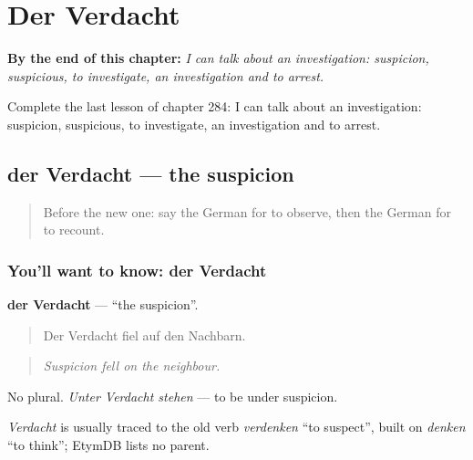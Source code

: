 
\chapter{Der Verdacht}
\label{ch:ge-der-verdacht}

\begin{chapteropening}
\textbf{By the end of this chapter:} \emph{I can talk about an investigation: suspicion, suspicious, to investigate, an investigation and to arrest.}

Complete the last lesson of chapter 284: I can talk about an investigation: suspicion, suspicious, to investigate, an investigation and to arrest.
\end{chapteropening}

\section[der Verdacht]{der Verdacht — the suspicion}

\label{lesson:GE-C284-verdacht}



\begin{quote}
Before the new one: say the German for to observe, then the German for to recount.
\end{quote}

\subsection*{You'll want to know: der Verdacht}
\textbf{der Verdacht} — \textquotedblleft{}the suspicion\textquotedblright{}.

\begin{quote}
Der Verdacht fiel auf den Nachbarn.
\end{quote}

\begin{quote}
\emph{Suspicion fell on the neighbour.}
\end{quote}

No plural. \emph{Unter Verdacht stehen} — to be under suspicion.

\begin{cousinweb}
\emph{Verdacht} is usually traced to the old verb \emph{verdenken} \textquotedblleft{}to suspect\textquotedblright{}, built on \emph{denken} \textquotedblleft{}to think\textquotedblright{}; EtymDB lists no parent.
\end{cousinweb}

